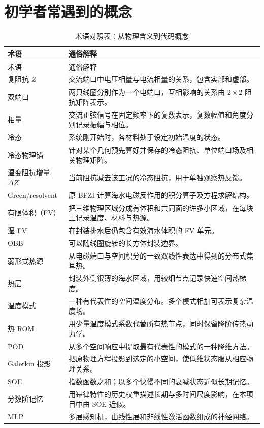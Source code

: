 \section{初学者常遇到的概念}
\begin{longtable}{p{3.7cm}p{10.2cm}}
\caption{术语对照表：从物理含义到代码概念}\\
\toprule
术语 & 通俗解释\\
\midrule
\endfirsthead
\toprule 术语 & 通俗解释\\ \midrule
\endhead
复阻抗 $Z$ & 交流端口中电压相量与电流相量的关系，包含实部和虚部。\\
双端口 & 两只线圈分别作为一个电端口，互相影响的关系由 $2\times2$ 阻抗矩阵表示。\\
相量 & 交流正弦信号在固定频率下的复数表示，复数幅值和角度分别记录振幅与相位。\\
冷态 & 系统刚开始时，各材料处于设定初始温度的状态。\\
冷态物理锚 & 针对某个几何预先算好并保存的冷态阻抗、单位端口场及相关物理矩阵。\\
温变阻抗增量 $\Delta Z$ & 当前阻抗减去该工况的冷态阻抗，用于单独观察热反馈。\\
Green/resolvent & 原 BFZI 计算海水电磁反作用的积分算子及方程求解结构。\\
有限体积（FV） & 把三维物理区域分成有体积和共同面的许多小区域，在每块上记录温度、材料与热源。\\
湿 FV & 在封装排水后仍包含有效海水体积的 FV 单元。\\
OBB & 可以随线圈旋转的长方体封装边界。\\
弱形式热源 & 从电磁端口与空间积分的一致双线性表达中得到的分布式焦耳热。\\
热层 & 封装外侧很薄的海水区域，用较细节点记录快速空间热梯度。\\
温度模式 & 一种有代表性的空间温度分布。多个模式相加可表示复杂温度场。\\
热 ROM & 用少量温度模式系数代替所有热节点，同时保留降阶传热动力学。\\
POD & 从多个空间响应中提取最有代表性的模式的一种降维方法。\\
Galerkin 投影 & 把原物理方程投影到选定的小空间，使低维状态服从相应物理关系。\\
SOE & 指数函数之和；以多个快慢不同的衰减状态近似长期记忆。\\
分数阶记忆 & 用幂律特性的历史权重描述长期与多时间尺度影响，在本项目中由 SOE 近似。\\
MLP & 多层感知机，由线性层和非线性激活函数组成的神经网络。\\

\end{longtable}
